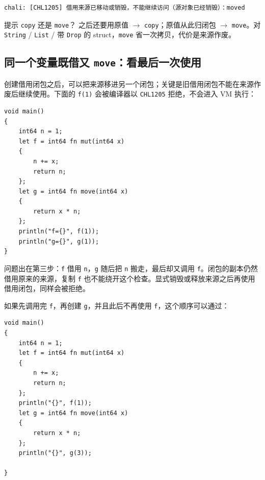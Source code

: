 \par
\medskip
\begin{lstlisting}[style=out]
chali: [CHL1205] 借用来源已移动或销毁，不能继续访问（源对象已经销毁）：moved
\end{lstlisting}
\par
\medskip

\begin{tip}{提示}
\texttt{copy} 还是 \texttt{move}？ 之后还要用原值 \ensuremath{\rightarrow} \texttt{copy}；原值从此归闭包 \ensuremath{\rightarrow} \texttt{move}。对 \texttt{String} / \texttt{List} / 带 \texttt{Drop} 的 struct，\texttt{move} 省一次拷贝，代价是来源作废。
\end{tip}

\subsection{同一个变量既借又 \texttt{move}：看最后一次使用}

创建借用闭包之后，可以把来源移进另一个闭包；关键是旧借用闭包不能在来源作废后继续使用。下面的 \texttt{f(\allowbreak{}1)\allowbreak{}} 会被编译器以 \texttt{CHL1205} 拒绝，不会进入 VM 执行：

\par
\medskip
\begin{lstlisting}[style=chali]
void main()
{
    int64 n = 1;
    let f = int64 fn mut(int64 x)
    {
        n += x;
        return n;
    };
    let g = int64 fn move(int64 x)
    {
        return x * n;
    };
    println("f={}", f(1));
    println("g={}", g(1));
}
\end{lstlisting}
\par
\medskip

问题出在第三步：\texttt{f} 借用 \texttt{n}，\texttt{g} 随后把 \texttt{n} 搬走，最后却又调用 \texttt{f}。闭包的副本仍然借用原来的来源，复制 \texttt{f} 也不能绕开这个检查。显式销毁或释放来源之后再使用借用闭包，同样会被拒绝。

如果先调用完 \texttt{f}，再创建 \texttt{g}，并且此后不再使用 \texttt{f}，这个顺序可以通过：

\par
\medskip
\begin{lstlisting}[style=chali]
void main()
{
    int64 n = 1;
    let f = int64 fn mut(int64 x)
    {
        n += x;
        return n;
    };
    println("{}", f(1));
    let g = int64 fn move(int64 x)
    {
        return x * n;
    };
    println("{}", g(3));

}
\end{lstlisting}
\par
\medskip

